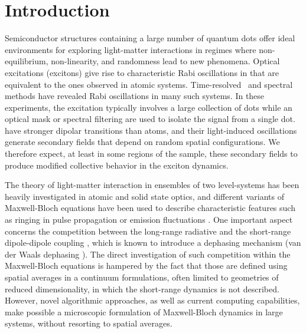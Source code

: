 \section{\label{sec:introduction}Introduction}
Semiconductor structures containing a large number of quantum dots offer ideal environments for exploring light-matter interactions in regimes where non-equilibrium, non-linearity, and randomness lead to new phenomena.
Optical excitations (excitons) give rise to characteristic Rabi oscillations in \qds{} that are equivalent to the ones observed in atomic systems.
Time-resolved~\cite{Stievater2001,shih} and spectral~\cite{kamada} methods have revealed Rabi oscillations in many such systems.
In these experiments, the excitation typically involves a large collection of dots while an optical mask or spectral filtering are used to isolate the signal from a single dot. \Qds{} have stronger dipolar transitions than atoms, and their light-induced oscillations generate secondary fields that depend on random spatial configurations.
We therefore expect, at least in some regions of the sample, these secondary fields to produce modified collective behavior in the exciton dynamics.

The theory of light-matter interaction in ensembles of two level-systems has been heavily investigated in atomic and solid state optics, and different variants of Maxwell-Bloch equations \cite{Gross1982} have been used to describe characteristic features such as ringing in pulse propagation \cite{Burnham-Chiao PR 188 667 1969,MacGillivray1976} or emission fluctuations \cite{Haake1979}.
One important aspect concerns the competition between the long-range radiative and the short-range dipole-dipole coupling \cite{Coffey1978}, which is known to introduce a dephasing mechanism (van der Waals dephasing \cite{Gross1982}).
The direct investigation of such competition within the Maxwell-Bloch equations is hampered by the fact that those are defined using spatial averages in a continuum formulations, often limited to geometries of reduced dimensionality, in which the short-range dynamics is not described.
However, novel algorithmic approaches, as well as current computing capabilities, make possible a microscopic formulation of Maxwell-Bloch dynamics in large systems, without resorting to spatial averages.


